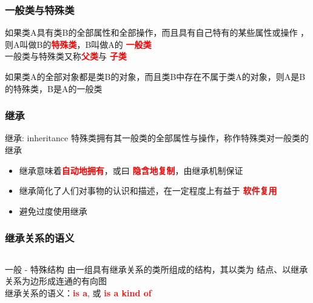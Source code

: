 \documentclass[compress]{beamer}
\begin{document}
\begin{frame}
  \frametitle{一般类与特殊类}
  \begin{definition}
    如果类A具有类B的全部属性和全部操作，而且具有自己特有的某些属性或操作
    ，则A叫做B的\textbf{\textcolor{red}{特殊类}}，B叫做A的
    \textbf{\textcolor{red}{一般类}}\\
    一般类与特殊类又称\textbf{\textcolor{red}{父类}}与
    \textbf{\textcolor{red}{子类}}
  \end{definition}

  \begin{definition}
    如果类A的全部对象都是类B的对象，而且类B中存在不属于类A的对象，则A是B
    的特殊类，B是A的一般类
  \end{definition}
\end{frame}

\begin{frame}
  \frametitle{继承}
  \begin{block}{继承: inheritance}
    特殊类拥有其一般类的全部属性与操作，称作特殊类对一般类的继承
    \begin{itemize} 
      \item 继承意味着\textbf{\textcolor{red}{自动地拥有}}，或曰
    \textbf{\textcolor{red}{隐含地复制}}，由继承机制保证
      \item 继承简化了人们对事物的认识和描述，在一定程度上有益于
        \textbf{\textcolor{red}{软件复用}}
    \item 避免过度使用继承
    \end{itemize}
  \end{block}
\end{frame}

\begin{frame}
  \frametitle{继承关系的语义}
  \begin{columns}[c]
  \column{.5\hsize}
  \begin{block}{一般 - 特殊结构}
    由一组具有继承关系的类所组成的结构，其以类为
    结点、以继承关系为边形成连通的有向图 \\
    继承关系的语义：\textbf{\textcolor{red}{is a}}, 或
\textbf{\textcolor{red}{is a kind of}}
  \end{block}
  \column{.5\hsize}
  \end{columns}
\end{frame}
\end{document}
